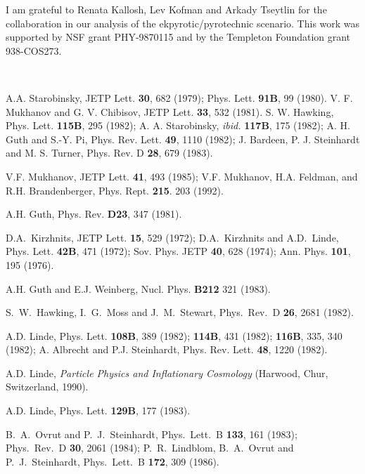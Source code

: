 \documentclass[a4paper,12pt]{article}
\begin{document}
I am grateful to Renata Kallosh, Lev Kofman and Arkady Tseytlin for the collaboration in our analysis of the ekpyrotic/pyrotechnic scenario. This work was 
supported by NSF grant PHY-9870115 and by the   
Templeton Foundation  grant 938-COS273. 

\
   

\begin{thebibliography}{99}

 A.A. Starobinsky, JETP Lett. {\bf 30}, 682  (1979); Phys.
Lett. {\bf 91B}, 99  (1980).
 V. F. Mukhanov and G. V. Chibisov, JETP  Lett. {\bf 33}, 532
(1981).
 S. W. Hawking, Phys. Lett. {\bf 115B}, 295 (1982); A. A.
Starobinsky, {\it ibid.} {\bf 117B}, 175 (1982); A. H. Guth and S.-Y. Pi,
Phys. Rev. Lett. {\bf 49}, 1110 (1982); J. Bardeen, P. J. Steinhardt and
M. S. Turner, Phys. Rev. D {\bf 28}, 679 (1983).

 V.F. Mukhanov, JETP Lett. {\bf 41},  493 (1985);
V.F. Mukhanov, H.A. Feldman, and R.H. Brandenberger, Phys. Rept. {\bf
215}. 203 (1992).

 A.H. Guth, Phys. Rev. {\bf D23}, 347  (1981).


 D.A.~Kirzhnits, JETP Lett. {\bf 15}, 529 (1972);
D.A.~Kirzhnits and A.D.~Linde, Phys. Lett. {\bf 42B}, 471 (1972); Sov.
Phys. JETP {\bf 40}, 628 (1974); Ann. Phys. {\bf 101}, 195 (1976).


 A.H. Guth and E.J. Weinberg,  Nucl. Phys. {\bf B212} 321 (1983).

S.~W.~Hawking, I.~G.~Moss and J.~M.~Stewart,
Phys.\ Rev.\ D {\bf 26}, 2681 (1982).




 A.D. Linde, Phys. Lett. {\bf 108B}, 389 (1982); {\bf
114B},  431 (1982); {\bf 116B}, 335, 340  (1982); A. Albrecht and P.J.
Steinhardt, Phys. Rev. Lett. {\bf 48}, 1220 (1982).

 A.D. Linde,  {\it  Particle  Physics  and
Inflationary Cosmology} (Harwood, Chur, Switzerland, 1990).


 A.D. Linde, Phys. Lett. {\bf 129B},  177 (1983).

B.~A.~Ovrut and P.~J.~Steinhardt,
Phys.\ Lett.\ B {\bf 133}, 161 (1983); Phys.\ Rev.\ D {\bf 30}, 2061 (1984); P.~R.~Lindblom, B.~A.~Ovrut and P.~J.~Steinhardt,
Phys.\ Lett.\ B {\bf 172}, 309 (1986).


\end{thebibliography}
\end{document}
